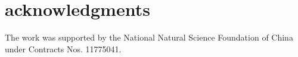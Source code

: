 \documentclass[%
reprint,
superscriptaddress,
showpacs,preprintnumbers,
 amsmath,amssymb,
 aps,
prl,
]{revtex4-1}
\begin{document}
\section{acknowledgments}
The work was supported by the National Natural Science Foundation of China under Contracts Nos. 11775041.


\end{document}
